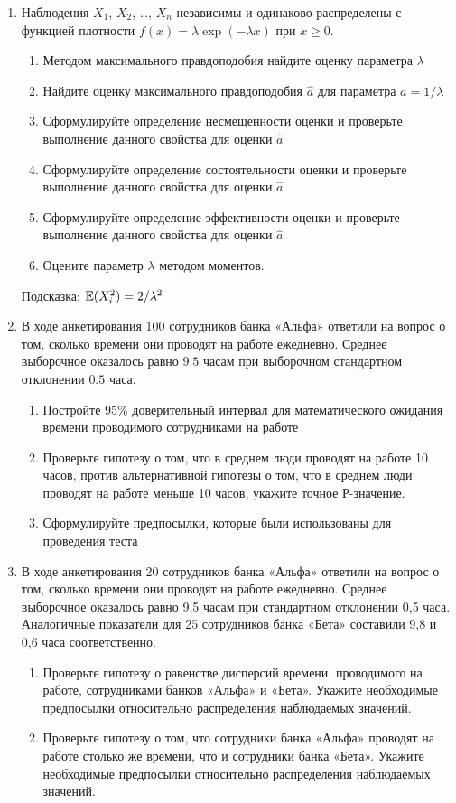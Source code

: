 \documentclass[12pt, a4paper]{article}\usepackage[]{graphicx}\usepackage[]{color}
\begin{document}
		\begin{enumerate}
			\item Наблюдения $X_1$, $X_2$, \ldots, $X_n$ независимы и одинаково распределены с функцией плотности $f(x)=\lambda \exp(-\lambda x)$ при $x\geq 0$.
			\begin{enumerate}
				\item Методом максимального правдоподобия найдите оценку параметра  $\lambda$
				\item Найдите оценку максимального правдоподобия $\hat{a}$ для параметра $a=1/\lambda$
				\item Сформулируйте определение несмещенности оценки и проверьте выполнение данного свойства для оценки $\hat{a}$
				\item Сформулируйте определение состоятельности оценки и проверьте выполнение данного свойства для оценки $\hat{a}$
				\item Сформулируйте определение эффективности  оценки и проверьте выполнение данного свойства для оценки $\hat{a}$
				\item Оцените параметр $\lambda$ методом моментов.
			\end{enumerate}
			Подсказка: $\mathbb{E}(X_i^2)=2/\lambda^2$

			\item В ходе анкетирования 100 сотрудников банка «Альфа» ответили на вопрос о том, сколько времени они проводят на работе ежедневно. Среднее выборочное оказалось равно $9.5$ часам при выборочном стандартном отклонении $0.5$ часа.
			\begin{enumerate}
				\item Постройте 95\% доверительный интервал для математического ожидания времени проводимого сотрудниками на работе
				\item Проверьте гипотезу о том, что в среднем люди проводят на работе 10 часов, против альтернативной гипотезы о том, что в среднем люди проводят на работе меньше 10 часов, укажите точное Р-значение.
				\item Сформулируйте предпосылки, которые были использованы для проведения теста
			\end{enumerate}

			\item В ходе анкетирования 20 сотрудников банка «Альфа» ответили на вопрос о том, сколько времени они проводят на работе ежедневно. Среднее выборочное оказалось равно 9,5 часам при стандартном отклонении 0,5 часа. Аналогичные показатели для 25 сотрудников банка «Бета» составили 9,8 и 0,6 часа соответственно.
			\begin{enumerate}
				\item Проверьте гипотезу о равенстве дисперсий времени, проводимого на работе, сотрудниками банков «Альфа» и «Бета». Укажите необходимые предпосылки относительно распределения наблюдаемых значений.
				\item Проверьте гипотезу о том, что сотрудники банка «Альфа» проводят на работе столько же времени, что и сотрудники банка «Бета». Укажите необходимые предпосылки относительно распределения наблюдаемых значений.
			\end{enumerate}

		\end{enumerate}
\end{document}
